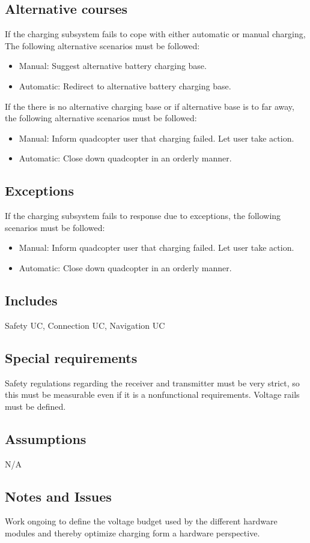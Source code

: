 \documentclass[a4paper]{article}
\begin{document}
\subsection{Alternative courses}
If the charging subsystem fails to cope with either automatic or manual charging,
The following alternative scenarios must be followed:
\begin{itemize}
	\item Manual: Suggest alternative battery charging base.
	\item Automatic: Redirect to alternative battery charging base.
\end{itemize}
If the there is no alternative charging base or if alternative base is to far away,
the following alternative scenarios must be followed:
\begin{itemize}
	\item Manual: Inform quadcopter user that charging failed. Let user take action.
	\item Automatic: Close down quadcopter in an orderly manner.
\end{itemize}
\subsection{Exceptions}
If the charging subsystem fails to response due to exceptions, the following scenarios must be followed:
\begin{itemize}
	\item Manual: Inform quadcopter user that charging failed. Let user take action.
	\item Automatic: Close down quadcopter in an orderly manner.
\end{itemize}
\subsection{Includes}
Safety UC, Connection UC, Navigation UC
\subsection{Special requirements}
Safety regulations regarding the receiver and transmitter must be very strict, so this must be measurable even if it is  a nonfunctional requirements. Voltage rails must be defined.
\subsection{Assumptions}
N/A
\subsection{Notes and Issues}
Work ongoing to define the voltage budget used by the different hardware modules and thereby optimize charging form a hardware perspective.
\end{document}
